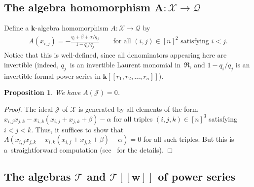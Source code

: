 \documentclass[pdftex]{sigma}
\newtheorem{Proposition}[Theorem]{Proposition}
\numberwithin{equation}{section}
\begin{document}
\subsection[The algebra homomorphism $A\colon \mathcal{X}\rightarrow\mathcal{Q}$]{The algebra homomorphism $\boldsymbol{A\colon \mathcal{X}\rightarrow\mathcal{Q}}$}

\begin{Definition}\label{def.A}Define a $\mathbf{k}$-algebra homomorphism $A\colon \mathcal{X}\rightarrow\mathcal{Q}$ by
\begin{gather*}
A ( x_{i,j} ) =-\frac{q_{i}+\beta+\alpha/q_{j}}{1-q_{i}/q_{j}}\qquad \text{for all }(i,j) \in[n] ^{2}\text{ satisfying }i<j.
\end{gather*}
Notice that this is well-defined, since all denominators appearing here are invertible (indeed, $q_{j}$~is an invertible Laurent monomial in~$\mathfrak{R}$, and $1-q_{i}/q_{j}$ is an invertible formal power series in
$\mathbf{k} [[ r_{1},r_{2},\ldots,r_{n} ] ] $).
\end{Definition}

\begin{Proposition}\label{prop.A.killsJ}We have $A ( \mathcal{J} ) =0$.
\end{Proposition}

\begin{proof}The ideal $\mathcal{J}$ of $\mathcal{X}$ is generated by all elements of the form $x_{i,j}x_{j,k}-x_{i,k} ( x_{i,j}+x_{j,k}+\beta ) -\alpha$ for all triples
$(i,j,k) \in[n] ^{3}$ satisfying $i<j<k$. Thus, it suffices to show that $A ( x_{i,j}x_{j,k}-x_{i,k} ( x_{i,j}+x_{j,k}+\beta ) -\alpha ) =0$ for all such triples. But this is a~straightforward computation (see~\cite{verlong} for the details).
\end{proof}

\subsection[The algebras $\mathcal{T}$ and $\protect{\mathcal{T}[[w]]}$ of power series]{The algebras $\boldsymbol{\mathcal{T}}$ and $\boldsymbol{\mathcal{T}[[w]]}$ of power series}
\end{document}
